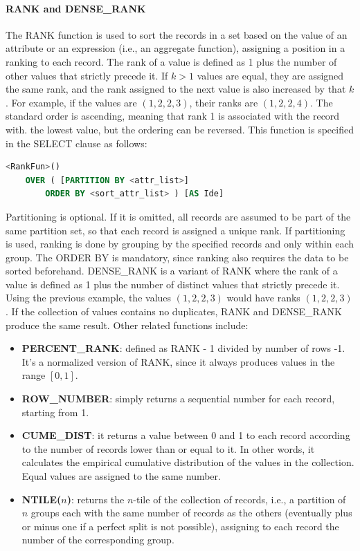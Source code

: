 \paragraph{RANK and DENSE\_RANK} The RANK function is used to sort the records in a set based on the value of an attribute or an expression (i.e., an aggregate function), assigning a position in a ranking to each record. The rank of a value is defined as 1 plus the number of other values that strictly precede it. If $k > 1$ values are equal, they are assigned the same rank, and the rank assigned to the next value is also increased by that $k$. For example, if the values are $(1, 2, 2, 3)$, their ranks are $(1, 2, 2, 4)$. The standard order is ascending, meaning that rank 1 is associated with the record with. the lowest value, but the ordering can be reversed. This function is specified in the SELECT clause as follows:
\begin{lstlisting}[language=SQL]
    <RankFun>()
    OVER ( [PARTITION BY <attr_list>]
        ORDER BY <sort_attr_list> ) [AS Ide]
\end{lstlisting}
Partitioning is optional. If it is omitted, all records are assumed to be part of the same partition set, so that each record is assigned a unique rank. If partitioning is used, ranking is done by grouping by the specified records and only within each group. The ORDER BY is mandatory, since ranking also requires the data to be sorted beforehand. DENSE\_RANK is a variant of RANK where the rank of a value is defined as 1 plus the number of distinct values that strictly precede it. Using the previous example, the values $(1, 2, 2, 3)$ would have ranks $(1, 2, 2, 3)$. If the collection of values contains no duplicates, RANK and DENSE\_RANK produce the same result. Other related functions include:
\begin{itemize}
    \item \textbf{PERCENT\_RANK}: defined as RANK - 1 divided by number of rows -1. It's a normalized version of RANK, since it always produces values in the range $[0, 1]$.
    \item \textbf{ROW\_NUMBER}: simply returns a sequential number for each record, starting from 1. 
    \item \textbf{CUME\_DIST}: it returns a value between 0 and 1 to each record according to the number of records lower than or equal to it. In other words, it calculates the empirical cumulative distribution of the values in the collection. Equal values are assigned to the same number.
    \item \textbf{NTILE($n$)}: returns the $n$-tile of the collection of records, i.e., a partition of $n$ groups each with the same number of records as the others (eventually plus or minus one if a perfect split is not possible), assigning to each record the number of the corresponding group.
\end{itemize}

